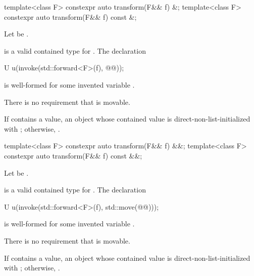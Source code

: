 \begin{itemdecl}
template<class F> constexpr auto transform(F&& f) &;
template<class F> constexpr auto transform(F&& f) const &;
\end{itemdecl}

\begin{itemdescr}
\pnum
Let  be .

\pnum
\mandates
{} is a valid contained type for .
The declaration
\begin{codeblock}
U u(invoke(std::forward<F>(f), @@));
\end{codeblock}
is well-formed for some invented variable .
\begin{note}
There is no requirement that  is movable.
\end{note}

\pnum
\returns
If  contains a value, an  object
whose contained value is direct-non-list-initialized with
;
otherwise, .
\end{itemdescr}

\begin{itemdecl}
template<class F> constexpr auto transform(F&& f) &&;
template<class F> constexpr auto transform(F&& f) const &&;
\end{itemdecl}

\begin{itemdescr}
\pnum
Let  be
.

\pnum
\mandates
{} is a valid contained type for .
The declaration
\begin{codeblock}
U u(invoke(std::forward<F>(f), std::move(@@)));
\end{codeblock}
is well-formed for some invented variable .
\begin{note}
There is no requirement that  is movable.
\end{note}

\pnum
\returns
If  contains a value, an  object
whose contained value is direct-non-list-initialized with
;
otherwise, .
\end{itemdescr}

